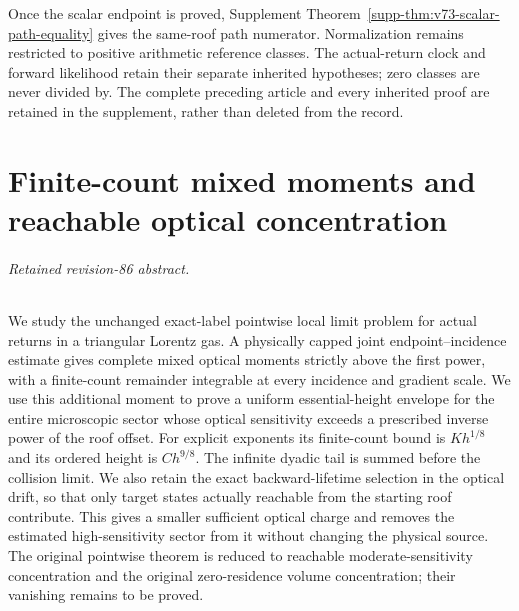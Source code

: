 \documentclass[11pt,reqno]{amsart}
\numberwithin{equation}{section}
\theoremstyle{definition}\newtheorem{definition}[theorem]{Definition}
\theoremstyle{remark}\newtheorem{remark}[theorem]{Remark}
\theoremstyle{definition}\newtheorem{inputstatement}[theorem]{Input statement}
\begin{document}
Once the scalar endpoint is proved, Supplement
Theorem~\ref{supp-thm:v73-scalar-path-equality} gives the same-roof
path numerator. Normalization remains restricted to positive arithmetic
reference classes. The actual-return clock and forward likelihood
retain their separate inherited hypotheses; zero classes are never
divided by. The complete preceding article and every inherited proof
are retained in the supplement, rather than deleted from the record.

\appendix


\endgroup
\part{Finite-count mixed moments and reachable optical concentration}
\begingroup
\let\ArchiveLabel\label
\let\ArchiveRef\ref
\renewcommand{\label}[1]{\ArchiveLabel{v86archive:#1}}
\renewcommand{\ref}[1]{%
  \IfBeginWith{#1}{supp-}{%
    \StrBehind{#1}{supp-}[\ArchiveTarget]%
    \ArchiveRef{\ArchiveTarget}%
  }{\ArchiveRef{v86archive:#1}}%
}
\makeatletter
\let\ltx@label\label
\makeatother
\let\ArchivePageRef\pageref
\renewcommand{\pageref}[1]{%
  \IfBeginWith{#1}{supp-}{%
    \StrBehind{#1}{supp-}[\ArchivePageTarget]%
    \ArchivePageRef{\ArchivePageTarget}%
  }{\ArchivePageRef{v86archive:#1}}%
}
\paragraph{Retained revision-86 abstract.}

We study the unchanged exact-label pointwise local limit problem for
actual returns in a triangular Lorentz gas. A physically capped joint
endpoint--incidence estimate gives complete mixed optical moments strictly
above the first power, with a finite-count remainder integrable at every
incidence and gradient scale. We use this additional moment to prove a
uniform essential-height envelope for the entire microscopic sector whose
optical sensitivity exceeds a prescribed inverse power of the roof offset.
For explicit exponents its finite-count bound is $K h^{1/8}$ and its
ordered height is $C h^{9/8}$. The infinite dyadic tail is summed before
the collision limit. We also retain the exact backward-lifetime selection
in the optical drift, so that only target states actually reachable from
the starting roof contribute. This gives a smaller sufficient optical
charge and removes the estimated high-sensitivity sector from it without
changing the physical source. The original pointwise theorem is reduced
to reachable moderate-sensitivity concentration and the original
zero-residence volume concentration; their vanishing remains to be proved.
\end{document}
